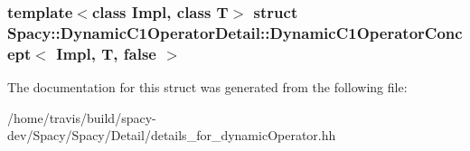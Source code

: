 \subsubsection*{template$<$class Impl, class T$>$ struct Spacy\-::\-Dynamic\-C1\-Operator\-Detail\-::\-Dynamic\-C1\-Operator\-Concept$<$ Impl, T, false $>$}



\-The documentation for this struct was generated from the following file\-:\begin{DoxyCompactItemize}
\item 
/home/travis/build/spacy-\/dev/\-Spacy/\-Spacy/\-Detail/details\-\_\-for\-\_\-dynamic\-Operator.\-hh\end{DoxyCompactItemize}
